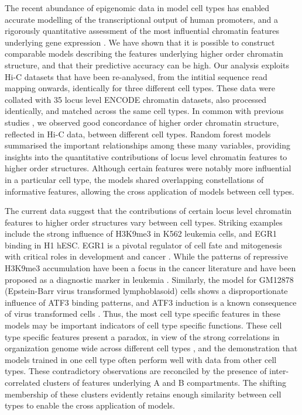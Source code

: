 \documentclass[a4paper,11pt,oneside]{book}
\begin{document}
The recent abundance of epigenomic data in model cell types has
enabled accurate modelling of the transcriptional output of human
promoters, and a rigorously quantitative assessment of the most
influential chromatin features underlying gene expression
\cite{Dong2012}. We have shown that it is possible to construct
comparable models describing the features underlying higher order
chromatin structure, and that their predictive accuracy can be
high. Our analysis exploits Hi-C datasets that have been re-analysed,
from the intitial sequence read mapping onwards, identically for three
different cell types. These data were collated with 35 locus level
ENCODE chromatin datasets, also processed identically, and matched
across the same cell types. In common with previous studies
\cite{Chambers2013, Dixon2012}, we observed good concordance of higher
order chromatin structure, reflected in Hi-C data, between different
cell types. Random forest models summarised the important
relationships among these many variables, providing insights into the
quantitative contributions of locus level chromatin features to higher
order structures. Although certain features were notably more
influential in a particular cell type, the models shared overlapping
constellations of informative features, allowing the cross application
of models between cell types.



The current data suggest that the contributions of certain locus level
chromatin features to higher order structures vary between cell
types. Striking examples include the strong influence of H3K9me3 in
K562 leukemia cells, and EGR1 binding in H1 hESC. EGR1 is a pivotal
regulator of cell fate and mitogenesis with critical roles in
development and cancer \cite{Zwang2012}. While the patterns of
repressive H3K9me3 accumulation have been a focus in the cancer
literature and have been proposed as a diagnostic marker in leukemia
\cite{Muller-Tidow2010}. Similarly, the model for GM12878
(Epstein-Barr virus transformed lymphoblasoid) cells shows a
disproportionate influence of ATF3 binding patterns, and ATF3
induction is a known consequence of virus transformed cells
\cite{Hagmeyer1996}. Thus, the most cell type specific features in
these models may be important indicators of cell type specific
functions. These cell type specific features present a paradox, in
view of the strong correlations in organization genome wide across
different cell types \cite{Chambers2013, Dixon2012}, and the
demonstration that models trained in one cell type often perform well
with data from other cell types. These contradictory observations are
reconciled by the presence of inter-correlated clusters of features
underlying A and B compartments. The shifting membership of these
clusters evidently retains enough similarity between cell types to
enable the cross application of models.
\end{document}

